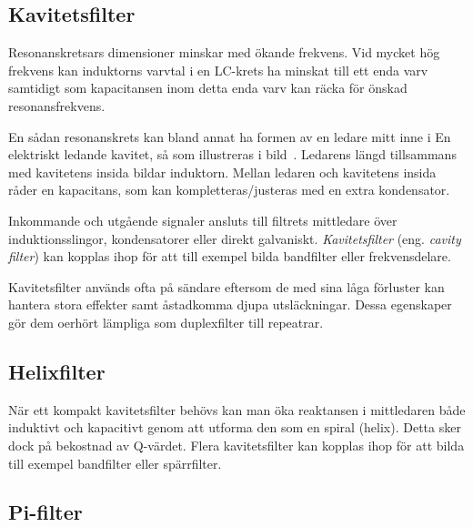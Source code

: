 \newpage %
\subsection{Kavitetsfilter}


Resonanskretsars dimensioner minskar med ökande frekvens.
Vid mycket hög frekvens kan induktorns varvtal i en LC-krets ha minskat till
ett enda varv samtidigt som kapacitansen inom detta enda varv kan räcka för
önskad resonansfrekvens.

En sådan resonanskrets kan bland annat ha formen av en ledare mitt inne i En
elektriskt ledande kavitet, så som illustreras i bild~.
Ledarens längd tillsammans med kavitetens insida bildar induktorn.
Mellan ledaren och kavitetens insida råder en kapacitans, som kan
kompletteras/justeras med en extra kondensator.

Inkommande och utgående signaler ansluts till filtrets mittledare över
induktionsslingor, kondensatorer eller direkt galvaniskt.
\emph{Kavitetsfilter} (eng. \emph{cavity filter}) kan kopplas ihop för att till
exempel bilda bandfilter eller frekvensdelare.

Kavitetsfilter används ofta på sändare eftersom de med sina låga förluster kan
hantera stora effekter samt åstadkomma djupa utsläckningar.
Dessa egenskaper gör dem oerhört lämpliga som duplexfilter till repeatrar.

\subsection{Helixfilter}

När ett kompakt kavitetsfilter behövs kan man öka reaktansen i mittledaren
både induktivt och kapacitivt genom att utforma den som en spiral (helix).
Detta sker dock på bekostnad av Q-värdet.
Flera kavitetsfilter kan kopplas ihop för att bilda till exempel bandfilter
eller spärrfilter.

\subsection{Pi-filter}


